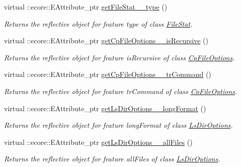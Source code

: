 \begin{DoxyCompactItemize}
virtual ::ecore::EAttribute\_\-ptr \hyperlink{classFMS__Data_1_1FMS__DataPackage_a69c0191ac7ab7bec0f0e405dbd0000af}{getFileStat\_\-\_\-type} ()
\begin{DoxyCompactList}\small\item\em Returns the reflective object for feature type of class \hyperlink{classFMS__Data_1_1FileStat}{FileStat}. \item\end{DoxyCompactList}\item 
virtual ::ecore::EAttribute\_\-ptr \hyperlink{classFMS__Data_1_1FMS__DataPackage_ae4109d36b3403c28f659bc55e325724f}{getCpFileOptions\_\-\_\-isRecursive} ()
\begin{DoxyCompactList}\small\item\em Returns the reflective object for feature isRecursive of class \hyperlink{classFMS__Data_1_1CpFileOptions}{CpFileOptions}. \item\end{DoxyCompactList}\item 
virtual ::ecore::EAttribute\_\-ptr \hyperlink{classFMS__Data_1_1FMS__DataPackage_add218fd30461a060481ebceca0d2c6e4}{getCpFileOptions\_\-\_\-trCommand} ()
\begin{DoxyCompactList}\small\item\em Returns the reflective object for feature trCommand of class \hyperlink{classFMS__Data_1_1CpFileOptions}{CpFileOptions}. \item\end{DoxyCompactList}\item 
virtual ::ecore::EAttribute\_\-ptr \hyperlink{classFMS__Data_1_1FMS__DataPackage_a2f6d356b51dd0f2be6fe03c53a27db25}{getLsDirOptions\_\-\_\-longFormat} ()
\begin{DoxyCompactList}\small\item\em Returns the reflective object for feature longFormat of class \hyperlink{classFMS__Data_1_1LsDirOptions}{LsDirOptions}. \item\end{DoxyCompactList}\item 
virtual ::ecore::EAttribute\_\-ptr \hyperlink{classFMS__Data_1_1FMS__DataPackage_a43911d4ddbc9d3386fd67c51848b9bcb}{getLsDirOptions\_\-\_\-allFiles} ()
\begin{DoxyCompactList}\small\item\em Returns the reflective object for feature allFiles of class \hyperlink{classFMS__Data_1_1LsDirOptions}{LsDirOptions}. \item\end{DoxyCompactList}\item 

\end{DoxyCompactItemize}
